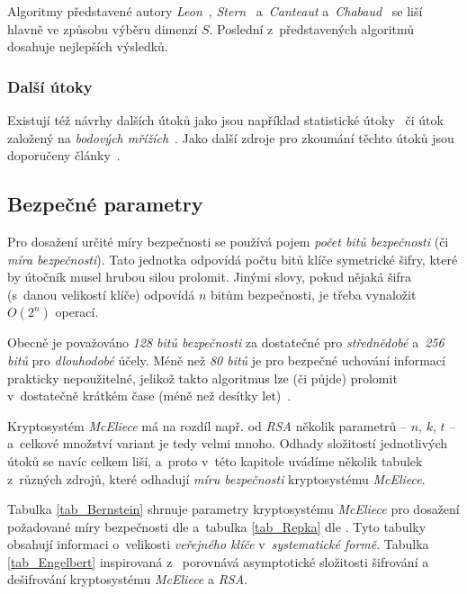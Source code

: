 \documentclass[thesis=M,czech,hidelinks]{FITthesis}[2012/06/26]
\newcommand{\0}{{\textcolor[gray]{0.75}{0}}}
\begin{document}
Algoritmy představené autory \emph{Leon}~\cite{Leon}, \emph{Stern}~\cite{Stern}
a~\emph{Canteaut} a~\emph{Chabaud}~\cite{Canteaut} se liší hlavně ve způsobu
výběru dimenzí $S$. Poslední z~představených algoritmů dosahuje nejlepších
výsledků.


\subsubsection{Další útoky}

Existují též návrhy dalších útoků jako jsou například statistické
útoky~\cite{Jabri} či útok založený na \emph{bodových mřížích}~\cite{Brickell}.
Jako další zdroje pro zkoumání těchto útoků jsou doporučeny
články~\cite{Repka,Engelbert}.



\subsection{Bezpečné parametry}\label{kap_bezpecne_parametry}

Pro dosažení určité míry bezpečnosti se používá pojem \emph{počet bitů
bezpečnosti} (či \emph{míra bezpečnosti}). Tato jednotka odpovídá počtu bitů
klíče symetrické šifry, které by útočník musel hrubou silou prolomit. Jinými
slovy, pokud nějaká šifra (s~danou velikostí klíče) odpovídá $n$ bitům
bezpečnosti, je třeba vynaložit $O\left(2^n\right)$ operací.

Obecně je považováno \emph{128 bitů bezpečnosti} za dostatečné pro
\emph{střednědobé} a~\emph{256 bitů} pro \emph{dlouhodobé} účely. Méně než
\emph{80 bitů} je pro bezpečné uchování informací prakticky nepoužitelné,
jelikož takto  algoritmus lze (či půjde) prolomit v~dostatečně krátkém
čase (méně než desítky let)~\cite{Paar}.

Kryptosystém \emph{McEliece} má na rozdíl např. od \emph{RSA} několik parametrů
-- $n$, $k$, $t$ -- a~celkové množství variant je tedy velmi mnoho. Odhady
složitostí jednotlivých útoků se navíc celkem liší, a~proto v~této kapitole
uvádíme několik tabulek z~různých zdrojů, které odhadují \emph{míru bezpečnosti}
kryptosystému \emph{McEliece}.

Tabulka \ref{tab_Bernstein} shrnuje parametry kryptosystému \emph{McEliece}
pro dosažení požadované míry bezpečnosti dle \cite{Bernstein1} a~tabulka
\ref{tab_Repka} dle \cite{Repka}. Tyto tabulky obsahují informaci o~velikosti
\emph{veřejného klíče} v~\emph{systematické formě}. Tabulka \ref{tab_Engelbert}
inspirovaná z~\cite{Engelbert,Paar} porovnává asymptotické složitosti šifrování
a dešifrování kryptosystému \emph{McEliece} a \emph{RSA}.
\end{document}
